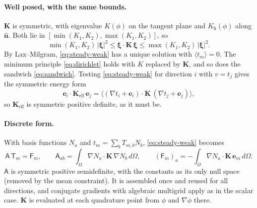 \documentclass[11pt]{article}
\newcommand{\Om}{\Omega}
\newcommand{\bn}{\hat{\mathbf n}}
\newcommand{\be}{\mathbf e}
\newcommand{\Keff}{\mathbf{K}_{\mathrm{eff}}}
\newcommand{\avg}[1]{\big\langle #1 \big\rangle}
\begin{document}
\paragraph{Well posed, with the same bounds.} $\mathbf K$ is symmetric, with
eigenvalue $K(\phi)$ on the tangent plane and $K_{\mathrm h}(\phi)$ along
$\bn$. Both lie in $[\min(K_1,K_2),\max(K_1,K_2)]$, so
\begin{equation}
\min(K_1,K_2)\,|\boldsymbol\xi|^2\le\boldsymbol\xi\cdot\mathbf K\,\boldsymbol\xi
\le\max(K_1,K_2)\,|\boldsymbol\xi|^2 .
\end{equation}
By Lax--Milgram, \eqref{eq:steady-weak} has a unique solution with
$\avg{t_m}=0$. The minimum principle \eqref{eq:dirichlet} holds with $K$
replaced by $\mathbf K$, and so does the sandwich \eqref{eq:sandwich}. Testing
\eqref{eq:steady-weak} for direction $i$ with $v=t_j$ gives the symmetric energy
form
\begin{equation}
\be_i\cdot\Keff\,\be_j=\avg{(\nabla t_i+\be_i)\cdot\mathbf K\,(\nabla t_j+\be_j)},
\end{equation}
so $\Keff$ is symmetric positive definite, as it must be.

\paragraph{Discrete form.} With basis functions $N_a$ and
$t_m=\sum_b T_{m,b}N_b$, \eqref{eq:steady-weak} becomes
\begin{equation}
\mathsf A\,\mathsf T_m=\mathsf F_m,\qquad
\mathsf A_{ab}=\int_\Om\nabla N_a\cdot\mathbf K\,\nabla N_b\,d\Om,\qquad
(\mathsf F_m)_a=-\int_\Om\nabla N_a\cdot\mathbf K\,\be_m\,d\Om .
\label{eq:discrete}
\end{equation}
$\mathsf A$ is symmetric positive semidefinite, with the constants as its only
null space (removed by the mean constraint). It is assembled once and reused for
all directions, and conjugate gradients with algebraic multigrid apply as in the
scalar case. $\mathbf K$ is evaluated at each quadrature point from $\phi$
and $\nabla\phi$ there.
\end{document}
